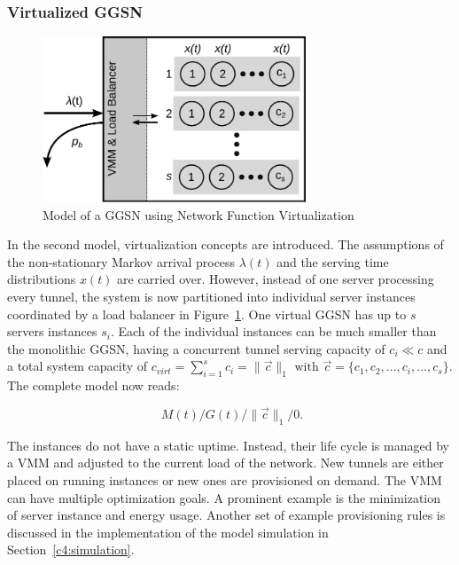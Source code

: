 \subsubsection{Virtualized \texorpdfstring{\acrshort{GGSN}}{GGSN}}
\label{c4:sec:virtual_ggsn}

\begin{figure}[htb]
	\centering
	\includegraphics[width=0.7\textwidth]{images/ggsn-virtualized.pdf}
	\caption{Model of a GGSN using Network Function Virtualization}
\label{c4:fig:model-ggsn-virtualized}
\end{figure}

In the second model, virtualization concepts are introduced. The assumptions of the non-stationary Markov arrival process $\lambda(t)$ and the serving time distributions $x(t)$ are carried over. However, instead of one server processing every tunnel, the system is now partitioned into individual server instances coordinated by a load balancer in Figure~\ref{c4:fig:model-ggsn-virtualized}. One virtual \gls{GGSN} has up to $s$ servers instances $s_i$.  Each of the individual instances can be much smaller than the monolithic \gls{GGSN}, having a concurrent tunnel serving capacity of $c_i \ll c$ and a total system capacity of $c_{virt} = \sum_{i=1}^{s} c_i = \| \overrightarrow{c}\|_1 \text{ with } \overrightarrow{c} = \{c_1, c_2, ... ,c_i, ... ,c_s\}$. %
The complete model now reads:

\begin{equation}
\phantom{.}M(t)/G(t)/\|\overrightarrow{c}\|_1/0\text{.}
\end{equation}

The instances do not have a static uptime. Instead, their life cycle is managed by a \gls{VMM} and adjusted to the current load of the network. New tunnels are either placed on running instances or new ones are provisioned on demand. The \gls{VMM} can have multiple optimization goals. A prominent example is the minimization of server instance and energy usage.  Another set of example provisioning rules is discussed in the implementation of the model simulation in Section~\ref{c4:simulation}. 

